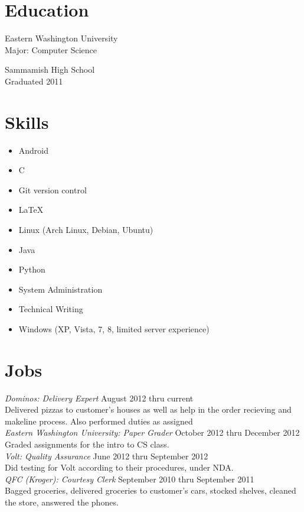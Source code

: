 \documentclass[line, margin, 10pt]{res}
\begin{document}
\address{12924 SE 26th ST \\ Bellevue WA, 98005 \\ +1 (425) 221-7761}
     
\begin{resume}
\section{Education}
Eastern Washington University \\
Major: Computer Science

Sammamish High School \\
Graduated 2011
     
\section{Skills}
\begin{itemize}
\item Android 
\item C
\item Git version control
\item \LaTeX
\item Linux (Arch Linux, Debian, Ubuntu)
\item Java
\item Python
\item System Administration
\item Technical Writing
\item Windows (XP, Vista, 7, 8, limited server experience)
\end{itemize}
     
\section{Jobs}
\textit{Dominos: Delivery Expert} \hfill August 2012 thru current \\
Delivered pizzas to customer's houses as well as help in the order
recieving and makeline process. Also performed duties as assigned \\ [6pt]
\textit{Eastern Washington University: Paper Grader} \hfill October 2012 thru December 2012 \\
Graded assignments for the intro to CS class. \\ [6pt]
\textit{Volt: Quality Assurance} \hfill June 2012 thru September 2012 \\
Did testing for Volt according to their procedures, under NDA. \\ [6pt]
\textit{QFC (Kroger): Courtesy Clerk} \hfill September 2010 thru September 2011 \\
Bagged groceries, delivered groceries to customer's cars, stocked
shelves, cleaned the store, answered the phones. \\ [6pt]


\end{resume}
\end{document}
